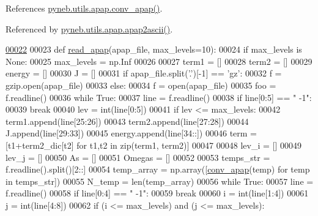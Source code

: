 References \hyperlink{apap_8py_source_l00012}{pyneb.\-utils.\-apap.\-conv\-\_\-apap()}.



Referenced by \hyperlink{apap_8py_source_l00078}{pyneb.\-utils.\-apap.\-apap2ascii()}.


\begin{DoxyCode}
\hypertarget{namespacepyneb_1_1utils_1_1apap_l00022}{}\hyperlink{namespacepyneb_1_1utils_1_1apap_ad24a246526c0913b752319c5a2846412}{00022} 
00023 \textcolor{keyword}{def }\hyperlink{namespacepyneb_1_1utils_1_1apap_ad24a246526c0913b752319c5a2846412}{read\_apap}(apap\_file, max\_levels=10):
00024     \textcolor{keywordflow}{if} max\_levels \textcolor{keywordflow}{is} \textcolor{keywordtype}{None}:
00025         max\_levels = np.Inf
00026         
00027     term1 = []
00028     term2 = []
00029     energy = []
00030     J = []
00031     \textcolor{keywordflow}{if} apap\_file.split(\textcolor{stringliteral}{'.'})[-1] == \textcolor{stringliteral}{'gz'}:
00032         f = gzip.open(apap\_file)
00033     \textcolor{keywordflow}{else}:
00034         f = open(apap\_file)
00035     foo = f.readline()
00036     \textcolor{keywordflow}{while} \textcolor{keyword}{True}:
00037         line = f.readline()
00038         \textcolor{keywordflow}{if} line[0:5] == \textcolor{stringliteral}{"   -1"}:
00039             \textcolor{keywordflow}{break}
00040         lev = int(line[0:5])
00041         \textcolor{keywordflow}{if} lev <= max\_levels:
00042             term1.append(line[25:26])
00043             term2.append(line[27:28])
00044             J.append(line[29:33])
00045             energy.append(line[34::])
00046     term = [t1+term2\_dic[t2] \textcolor{keywordflow}{for} t1,t2 \textcolor{keywordflow}{in} zip(term1, term2)]
00047     
00048     lev\_i = []
00049     lev\_j = []
00050     As = []
00051     Omegas = []
00052     
00053     temps\_str = f.readline().split()[2::]
00054     temp\_array = np.array([\hyperlink{namespacepyneb_1_1utils_1_1apap_ac3d6e43ef2ad84632e9b5a101e115cb1}{conv\_apap}(temp) \textcolor{keywordflow}{for} temp \textcolor{keywordflow}{in} temps\_str])
00055     N\_temp = len(temp\_array)
00056     \textcolor{keywordflow}{while} \textcolor{keyword}{True}:
00057         line = f.readline()
00058         \textcolor{keywordflow}{if} line[0:4] == \textcolor{stringliteral}{"  -1"}:
00059             \textcolor{keywordflow}{break}
00060         i = int(line[1:4])
00061         j = int(line[4:8])
00062         \textcolor{keywordflow}{if} (i <= max\_levels) \textcolor{keywordflow}{and} (j <= max\_levels):

\end{DoxyCode}
